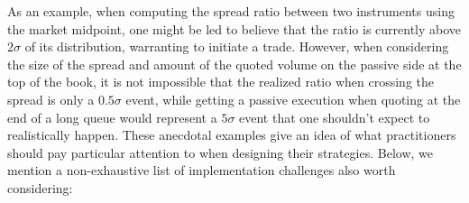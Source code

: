 As an example, when computing the spread ratio between two instruments using the market midpoint, one might be led to believe that the ratio is currently above $2\sigma$ of its distribution, warranting to initiate a trade. However, when considering the size of the spread and amount of the quoted volume on the passive side at the top of the book, it is not impossible that the realized ratio when crossing the spread is only a $0.5\sigma$ event, while getting a passive execution when quoting at the end of a long queue would represent a $5\sigma$ event that one shouldn't expect to realistically happen. These anecdotal examples give an idea of what practitioners should pay particular attention to when designing their strategies. Below, we mention a non-exhaustive list of implementation challenges also worth considering:

